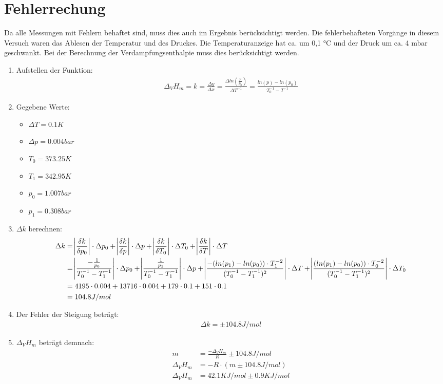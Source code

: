 \section*{Fehlerrechung}
Da alle Messungen mit Fehlern behaftet sind, muss dies auch im Ergebnis
berücksichtigt werden. Die fehlerbehafteten Vorgänge in diesem Versuch waren
das Ablesen der Temperatur und des Druckes. Die Temperaturanzeige hat ca.
um 0,1 °C und der Druck um ca. 4 mbar geschwankt. Bei der Berechnung der 
Verdampfungsenthalpie muss dies berücksichtigt werden.

\begin{enumerate}
    \item Aufstellen der Funktion:
    \begin{align*}
        \Delta_V H_m = k = \frac{\Delta y}{\Delta x} = \frac{\Delta 
        ln(\frac{p}{p_0})}{\Delta T^{-1}} 
        = \frac{ln(p) - ln(p_0)}{T_0^{-1} - T^{-1}}
    \end{align*}
    \item Gegebene Werte: 
    \begin{itemize}
        \item $\Delta T = 0.1K$
        \item $\Delta p = 0.004bar$
        \item $T_0 = 373.25K$
        \item $T_1 = 342.95K$
        \item $p_0 = 1.007bar$
        \item $p_1 = 0.308bar$
    \end{itemize}
    \item $\Delta k$ berechnen:
    \begin{align*}
        \Delta k &= \abs{\frac{\delta k}{\delta p_0}} \cdot \Delta p_0
        + \abs{\frac{\delta k}{\delta p}} \cdot \Delta p 
        + \abs{\frac{\delta k}{\delta T_0}} \cdot \Delta T_0
        + \abs{\frac{\delta k}{\delta T}} \cdot \Delta T \\
        &= \abs{\frac{-\frac{1}{p_0}}{T_0^{-1} - T_1^{-1}}} \cdot \Delta p_0
        + \abs{\frac{\frac{1}{p_1}}{T_0^{-1} - T_1^{-1}}} \cdot \Delta p
        + \abs{\frac{-(ln(p_1) - ln(p_0)) \cdot T_1^{-2}}{(T_0^{-1} - T_1^{-1})^2}} \cdot \Delta T
        + \abs{\frac{(ln(p_1)-ln(p_0)) \cdot T_0^{-2}}{(T_0^{-1} - T_1^{-1})^2}} \cdot \Delta T_0 \\
        &= 4195 \cdot 0.004 + 13716 \cdot 0.004 + 179 \cdot 0.1 + 151 \cdot 0.1 \\
        &= 104.8 J/mol
    \end{align*}
     \item Der Fehler der Steigung beträgt: 
     \begin{align*}
         \Delta k = \pm 104.8 J/mol
     \end{align*}
     \item $\Delta_V H_m$ beträgt demnach:
     \begin{align*}
        m &= \frac{-\Delta_V H_m}{R} \pm 104.8 J/mol \\
        \Delta_V H_m &= - R \cdot  (m \pm 104.8 J/mol) \\
        \Delta_V H_m &= 42.1 KJ/mol \pm 0.9 KJ/mol
     \end{align*}  
\end{enumerate} 